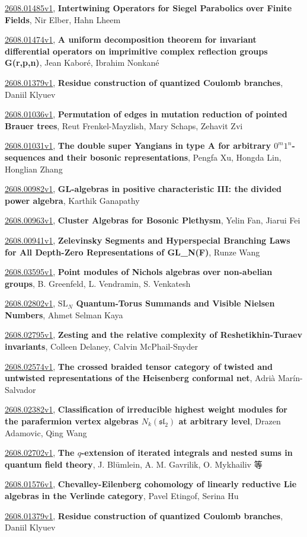 \documentclass[9pt, a4paper]{article}
\theoremstyle{plain}
\theoremstyle{definition}
\theoremstyle{remark}
\newcommand{\arxiv}[3]{\href{https://arxiv.org/abs/#1}{#1}, \textbf{\textcolor{arxivblue}{#2}}, #3}
\begin{document}
\arxiv{2608.01485v1}{Intertwining Operators for Siegel Parabolics over Finite Fields}{Nir Elber, Hahn Lheem}

\arxiv{2608.01474v1}{A uniform decomposition theorem for invariant differential operators on imprimitive complex reflection groups G(r,p,n)}{Jean Kaboré, Ibrahim Nonkané}

\arxiv{2608.01379v1}{Residue construction of quantized Coulomb branches}{Daniil Klyuev}

\arxiv{2608.01036v1}{Permutation of edges in mutation reduction of pointed Brauer trees}{Reut Frenkel-Mayzlish, Mary Schaps, Zehavit Zvi}

\arxiv{2608.01031v1}{The double super Yangians in type A for arbitrary $0^m 1^n$-sequences and their bosonic representations}{Pengfa Xu, Hongda Lin, Honglian Zhang}

\arxiv{2608.00982v1}{GL-algebras in positive characteristic III: the divided power algebra}{Karthik Ganapathy}

\arxiv{2608.00963v1}{Cluster Algebras for Bosonic Plethysm}{Yelin Fan, Jiarui Fei}

\arxiv{2608.00941v1}{Zelevinsky Segments and Hyperspecial Branching Laws for All Depth-Zero Representations of GL_N(F)}{Runze Wang}

\arxiv{2608.03595v1}{Point modules of Nichols algebras over non-abelian groups}{B. Greenfeld, L. Vendramin, S. Venkatesh}

\arxiv{2608.02802v1}{$\mathrm{SL}_N$ Quantum-Torus Summands and Visible Nielsen Numbers}{Ahmet Selman Kaya}

\arxiv{2608.02795v1}{Zesting and the relative complexity of Reshetikhin-Turaev invariants}{Colleen Delaney, Calvin McPhail-Snyder}

\arxiv{2608.02574v1}{The crossed braided tensor category of twisted and untwisted representations of the Heisenberg conformal net}{Adrià Marín-Salvador}

\arxiv{2608.02382v1}{Classification of irreducible highest weight modules for the parafermion vertex algebras $N_k(\mathfrak{sl}_2)$ at arbitrary level}{Drazen Adamovic, Qing Wang}

\arxiv{2608.02702v1}{The $q$-extension of iterated integrals and nested sums in quantum field theory}{J. Blümlein, A. M. Gavrilik, O. Mykhailiv 等}

\arxiv{2608.01576v1}{Chevalley-Eilenberg cohomology of linearly reductive Lie algebras in the Verlinde category}{Pavel Etingof, Serina Hu}

\arxiv{2608.01379v1}{Residue construction of quantized Coulomb branches}{Daniil Klyuev}

\end{document}
